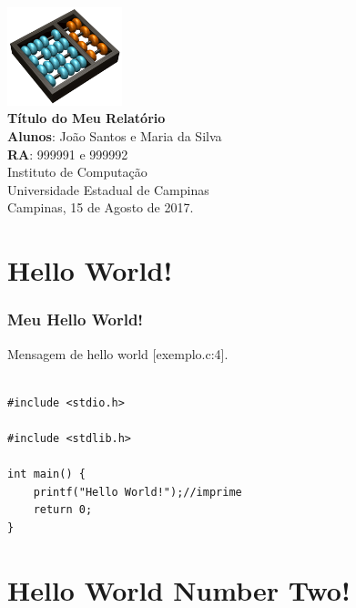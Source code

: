 \documentclass[12pt,a4paper]{report}
\begin{document}
\begin{titlepage}
    \begin{center}
        \vspace*{1cm}
        \includegraphics[width=0.25\textwidth]{Logo}\\
        \vspace{1.5cm}
        \Huge
    	\textbf{Título do Meu Relatório}\\
        \vspace{1.5cm}
        \Large
        \textbf{Alunos}: João Santos e Maria da Silva\\
        \textbf{RA}: 999991 e 999992\\
        \vspace{1.2cm}
    	\Large 
    	Instituto de Computação\\
    	Universidade Estadual de Campinas\\
    	\vspace{1.5cm}
        Campinas, 15 de Agosto de 2017.
    \end{center}
\end{titlepage}
\tableofcontents
\clearpage

\newcommand{\shellcmd}[1]{\texttt{\footnotesize\# #1}}%

\section{Hello World!}

\subsubsection{Meu Hello World!}
Mensagem de hello world [exemplo.c:4].

\begin{lstlisting}[style=CStyle]%incluindo código no arquivo

#include <stdio.h>

#include <stdlib.h>

int main() {
    printf("Hello World!");//imprime
    return 0;
}
\end{lstlisting}

\section{Hello World Number Two!}
\end{document}
